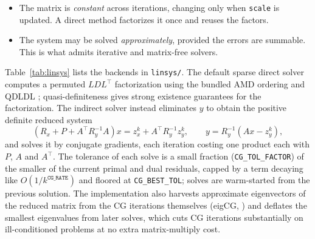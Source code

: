 \documentclass[11pt,a4paper]{article}
\newcommand{\tr}{^\top}
\theoremstyle{plain}
\begin{document}
\begin{itemize}
\item The matrix is \emph{constant} across iterations, changing only when
  \texttt{scale} is updated. A direct method factorizes it once and reuses the
  factors.
\item The system may be solved \emph{approximately}, provided the errors are
  summable. This is what admits iterative and matrix-free solvers.
\end{itemize}

Table~\ref{tab:linsys} lists the backends in \texttt{linsys/}. The default
sparse direct solver computes a permuted $LDL\tr$ factorization using the
bundled AMD \cite{amd} ordering and QDLDL \cite{qdldl}; quasi-definiteness
gives strong existence guarantees for the factorization. The indirect solver
instead eliminates $y$ to obtain the positive definite reduced system
\begin{equation}\label{eq:reduced}
\left(R_x + P + A\tr R_y^{-1} A\right) x = z^k_x + A\tr R_y^{-1} z^k_y,
\qquad y = R_y^{-1}\left(Ax - z^k_y\right),
\end{equation}
and solves it by conjugate gradients, each iteration costing one product each
with $P$, $A$ and $A\tr$. The tolerance of each solve is a small fraction
(\texttt{CG\_TOL\_FACTOR}) of the smaller of the current primal and dual
residuals, capped by a term decaying like $O(1/k^{\texttt{CG\_RATE}})$ and
floored at \texttt{CG\_BEST\_TOL}; solves are warm-started from the previous
solution. The implementation also harvests approximate eigenvectors of the
reduced matrix from the CG iterations themselves (eigCG, \cite{eigcg}) and
deflates the smallest eigenvalues from later solves, which cuts CG iterations
substantially on ill-conditioned problems at no extra matrix-multiply cost.
\end{document}

